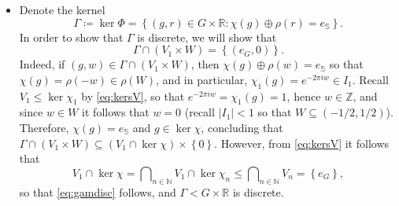 \documentclass{amsart}
\numberwithin{equation}{subsection}
\theoremstyle{remark}
\begin{document}
\begin{itemize}
    We can now conclude the surjectivity of \(\Phi\) by showing that \(\Phi\left(g_{o},r_{o}\right)=z\). For an arbitrary \(m\in\mathbb{N}\), the \(m^{\mathrm{th}}\) coordinate of \(\Phi\left(g_{n},r_{o}\right)\) equals \(z_{m}\) for all \(n\geq m\), and by continuity the \(m^{\mathrm{th}}\) coordinate of \(\Phi\left(g_{o},r_{o}\right)\) equals \(z_{m}\). Thus, \(\Phi\left(g_{o},r_{o}\right)=\left(z_{m}\right)_{m\in\mathbb{N}}=z\), and this proves the surjectivity of \(\Phi\).
    \item Denote the kernel
    \[\Gamma\coloneqq\ker\Phi=\left\{ \left(g,r\right)\in G\times\mathbb{R}:\chi\left(g\right)\oplus\rho\left(r\right)=e_{\mathbb{S}}\right\}.\]
    In order to show that \(\Gamma\) is discrete, we will show that
    \begin{equation}\label{eq:gamdisc}
    \Gamma\cap\left(V_{1}\times W\right)=\left\{ \left(e_{G},0\right)\right\}.
    \end{equation}
    Indeed, if \(\left(g,w\right)\in\Gamma\cap\left(V_{1}\times W\right)\), then \(\chi\left(g\right)\oplus\rho\left(w\right)=e_{\mathbb{S}}\) so that \(\chi\left(g\right)=\rho\left(-w\right)\in\rho\left(W\right)\), and in particular, \(\chi_{1}\left(g\right)=e^{-2\pi iw}\in I_{1}\). Recall \(V_{1}\leq\ker\chi_{1}\) by \eqref{eq:kersV}, so that \(e^{-2\pi iw}=\chi_{1}\left(g\right)=1\), hence \(w\in\mathbb{Z}\), and since \(w\in W\) it follows that \(w=0\) (recall \(\left|I_{1}\right|<1\) so that \(W\subseteq\left(-1/2,1/2\right)\)). Therefore, \(\chi\left(g\right)=e_{\mathbb{S}}\) and \(g\in\ker\chi\), concluding that \(\Gamma\cap\left(V_{1}\times W\right)\subseteq\left(V_{1}\cap\ker\chi\right)\times\left\{ 0\right\}\). However, from \eqref{eq:kersV} it follows that
    \[V_{1}\cap\ker\chi=\bigcap\nolimits_{n\in\mathbb{N}}V_{1}\cap\ker\chi_{n}\leq\bigcap\nolimits_{n\in\mathbb{N}}V_{n}=\left\{ e_{G}\right\},\]
    so that \eqref{eq:gamdisc} follows, and \(\Gamma<G\times\mathbb{R}\) is discrete.
\end{itemize}
\end{document}
